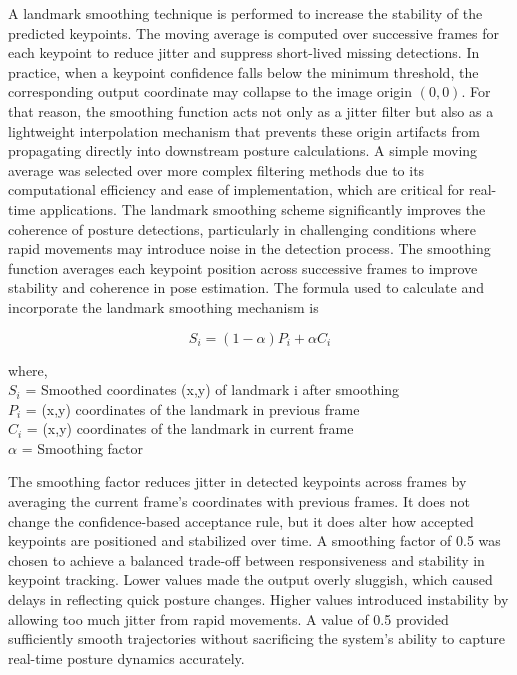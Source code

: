 \documentclass[11pt]{article}
\begin{document}
A landmark smoothing technique is performed to increase the stability of the predicted keypoints. The moving average is computed over successive frames for each keypoint  to reduce jitter   and suppress short-lived missing detections. In practice, when a keypoint confidence falls below the minimum threshold, the corresponding output coordinate may collapse to the image origin \((0,0)\). For that reason, the smoothing function acts not only as a jitter filter but also as a lightweight interpolation mechanism that prevents these origin artifacts from propagating directly into downstream posture calculations.  A simple moving average was selected over more complex filtering methods due to its computational efficiency and ease of implementation, which are critical for real-time applications.
The landmark smoothing scheme significantly improves the coherence of posture detections, particularly in challenging conditions where rapid movements may introduce noise in the detection process.   The smoothing function averages each keypoint position across successive frames to improve  stability and coherence   in  pose estimation. The  formula used to calculate and incorporate the landmark smoothing mechanism is

\begin{equation}
     S_i = (1 - \alpha)P_i + \alpha C_i
\end{equation}

where, 
\\ $S_i$ = Smoothed coordinates (x,y) of landmark i after smoothing
\\ $P_i$ = (x,y) coordinates of the landmark in previous frame
\\ $C_i$ = (x,y) coordinates of the landmark in current frame
\\ $\alpha$ = Smoothing factor

The smoothing factor reduces jitter in detected keypoints across frames by averaging the current frame’s coordinates with previous frames. It does not   change the confidence-based acceptance rule, but it does alter how accepted  keypoints are positioned and stabilized over time. A smoothing factor of 0.5 was chosen to achieve a balanced trade-off between responsiveness and stability in keypoint tracking. Lower values made the output overly sluggish, which caused delays in reflecting quick posture changes. Higher values introduced instability by allowing too much jitter from rapid movements. A value of 0.5 provided sufficiently smooth trajectories without sacrificing the system’s ability to capture real-time posture dynamics accurately. 
\end{document}
